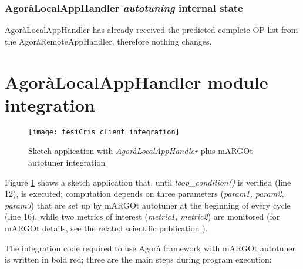 \subsubsection{AgoràLocalAppHandler \textit{autotuning} internal state}

AgoràLocalAppHandler has already received the predicted complete OP list from the AgoràRemoteAppHandler, therefore nothing changes.





\section{AgoràLocalAppHandler module integration}

\begin{figure}[H]

    \centering
    \texttt{[image: tesiCris\_client\_integration]}
    \caption{Sketch application with \textit{AgoràLocalAppHandler} plus mARGOt autotuner integration}
    \label{fig::sketchApp}
    
\end{figure}

Figure \ref{fig::sketchApp} shows a sketch application that, until \textit{loop\_condition()} is verified (line 12), is executed; computation depends on three parameters (\textit{param1, param2, param3}) that are set up by mARGOt autotuner at the beginning of every cycle (line 16), while two metrics of interest (\textit{metric1, metric2}) are monitored (for mARGOt details, see the related scientific publication \cite{gadioli2015application}).

The integration code required to use Agorà framework with mARGOt autotuner is written in bold red; three are the main steps during program execution:

